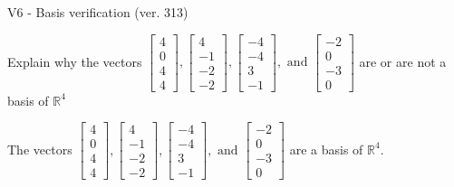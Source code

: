 \begin{exercise}
  \begin{exerciseTitle}V6 - Basis verification (ver. 313)\end{exerciseTitle}
  \begin{exerciseStatement}
    Explain why the vectors \(\left[\begin{array}{r}
4 \\
0 \\
4 \\
4
\end{array}\right] , \left[\begin{array}{r}
4 \\
-1 \\
-2 \\
-2
\end{array}\right] , \left[\begin{array}{r}
-4 \\
-4 \\
3 \\
-1
\end{array}\right] , \text{ and } \left[\begin{array}{r}
-2 \\
0 \\
-3 \\
0
\end{array}\right]\) are or are not a basis of \(\mathbb{R}^4\)	


  \end{exerciseStatement}
  \begin{exerciseAnswer}
   The vectors \(\left[\begin{array}{r}
4 \\
0 \\
4 \\
4
\end{array}\right] , \left[\begin{array}{r}
4 \\
-1 \\
-2 \\
-2
\end{array}\right] , \left[\begin{array}{r}
-4 \\
-4 \\
3 \\
-1
\end{array}\right] , \text{ and } \left[\begin{array}{r}
-2 \\
0 \\
-3 \\
0
\end{array}\right]\) 
  	 are  a basis of \(\mathbb{R}^4\).
  


  \end{exerciseAnswer}
\end{exercise}